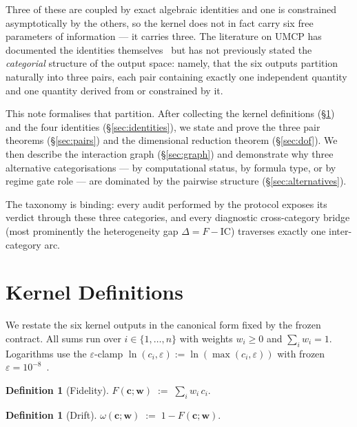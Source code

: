 \documentclass[
  aps,
  prd,
  twocolumn,
  superscriptaddress,
  nofootinbib,
  floatfix
]{revtex4-2}
\newtheorem{definition}[theorem]{Definition}
\newcommand{\eps}{\varepsilon}
\newcommand{\tvec}{\mathbf{c}}
\newcommand{\wvec}{\mathbf{w}}
\newcommand{\IC}{\mathrm{IC}}
\begin{document}
Three of these are coupled by exact algebraic identities and one
is constrained asymptotically by the others, so the kernel does
not in fact carry six free parameters of information --- it carries
three.  The literature on UMCP has documented the identities
themselves~\cite{paulus2025umcp,paulus2025physicscoherence} but
has not previously stated the \emph{categorial} structure of the
output space: namely, that the six outputs partition naturally
into three pairs, each pair containing exactly one independent
quantity and one quantity derived from or constrained by it.

This note formalises that partition.  After collecting the
kernel definitions (\S\ref{sec:defs}) and the four identities
(\S\ref{sec:identities}), we state and prove the three pair
theorems (\S\ref{sec:pairs}) and the dimensional reduction
theorem (\S\ref{sec:dof}).  We then describe the interaction
graph (\S\ref{sec:graph}) and demonstrate why three alternative
categorisations --- by computational status, by formula type, or
by regime gate role --- are dominated by the pairwise structure
(\S\ref{sec:alternatives}).

The taxonomy is binding: every audit performed by the protocol
exposes its verdict through these three categories, and every
diagnostic cross-category bridge (most prominently the
heterogeneity gap $\Delta=F-\IC$) traverses exactly one
inter-category arc.

\section{Kernel Definitions}\label{sec:defs}

We restate the six kernel outputs in the canonical form fixed by
the frozen contract.  All sums run over $i\in\{1,\dots,n\}$ with
weights $w_i\geq 0$ and $\sum_i w_i = 1$.  Logarithms use the
$\eps$-clamp $\ln(c_i,\eps):=\ln(\max(c_i,\eps))$ with frozen
$\eps=10^{-8}$~\cite{paulus2026umcpcasepack}.

\begin{definition}[Fidelity]\label{def:F}
$F(\tvec;\wvec) \;:=\; \sum_i w_i\,c_i.$
\end{definition}

\begin{definition}[Drift]\label{def:omega}
$\omega(\tvec;\wvec) \;:=\; 1 - F(\tvec;\wvec).$
\end{definition}
\end{document}
